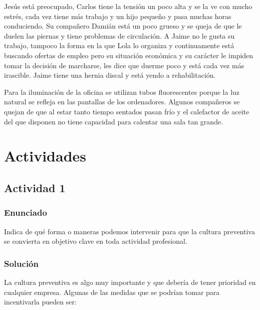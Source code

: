Jesús está preocupado, Carlos tiene la tensión un poco alta y se la ve con mucho estrés, cada vez tiene más trabajo y un hijo pequeño y pasa muchas horas conduciendo. Su compañero Damián está un poco grueso y se queja de que le duelen las piernas y tiene problemas de circulación. A Jaime no le gusta su trabajo, tampoco la forma en la que Lola lo organiza y continuamente está buscando ofertas de empleo pero su situación económica y su carácter le impiden tomar la decisión de marcharse, les dice que duerme poco y está cada vez más irascible. Jaime tiene una hernia discal y está yendo a rehabilitación.

Para la iluminación de la oficina se utilizan tubos fluorescentes porque la luz natural se refleja en las pantallas de los ordenadores. Algunos compañeros se quejan de que al estar tanto tiempo sentados pasan frío y el calefactor de aceite del que disponen no tiene capacidad para calentar una sala tan grande.

\section{Actividades}

\subsection{Actividad 1}

\subsubsection{Enunciado}
Indica de qué forma o maneras podemos intervenir para que la cultura preventiva se convierta en objetivo clave en toda actividad profesional.

\subsubsection{Solución}
La cultura preventiva es algo muy importante y que debería de tener prioridad en cualquier empresa. Algunas de las medidas que se podrían tomar para incentivarla pueden ser:

